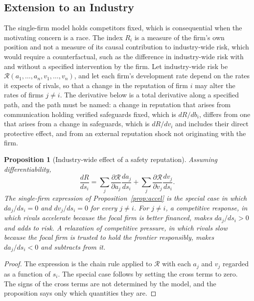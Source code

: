 \documentclass[12pt]{article}
\newtheorem{proposition}{Proposition}
\theoremstyle{definition}
\theoremstyle{remark}
\begin{document}
\subsection{Extension to an Industry}

The single-firm model holds competitors fixed, which is consequential when the motivating concern is a race. The index $R_i$ is a measure of the firm's own position and not a measure of its causal contribution to industry-wide risk, which would require a counterfactual, such as the difference in industry-wide risk with and without a specified intervention by the firm. Let industry-wide risk be $\mathcal R(a_1,\ldots,a_n,v_1,\ldots,v_n)$, and let each firm's development rate depend on the rates it expects of rivals, so that a change in the reputation of firm $i$ may alter the rates of firms $j\neq i$. The derivative below is a total derivative along a specified path, and the path must be named: a change in reputation that arises from communication holding verified safeguards fixed, which is $dR/db_i$, differs from one that arises from a change in safeguards, which is $dR/dv_i$ and includes their direct protective effect, and from an external reputation shock not originating with the firm.

\begin{proposition}[Industry-wide effect of a safety reputation]
\label{prop:industry}
Assuming differentiability,
\[
\frac{dR}{ds_i}=\sum_{j}\frac{\partial\mathcal R}{\partial a_j}\frac{da_j}{ds_i}+\sum_{j}\frac{\partial\mathcal R}{\partial v_j}\frac{dv_j}{ds_i}.
\]
The single-firm expression of Proposition~\ref{prop:accel} is the special case in which $da_j/ds_i=0$ and $dv_j/ds_i=0$ for every $j\neq i$. For $j\neq i$, a competitive response, in which rivals accelerate because the focal firm is better financed, makes $da_j/ds_i>0$ and adds to risk. A relaxation of competitive pressure, in which rivals slow because the focal firm is trusted to hold the frontier responsibly, makes $da_j/ds_i<0$ and subtracts from it.
\end{proposition}

\begin{proof}
The expression is the chain rule applied to $\mathcal R$ with each $a_j$ and $v_j$ regarded as a function of $s_i$. The special case follows by setting the cross terms to zero. The signs of the cross terms are not determined by the model, and the proposition says only which quantities they are. \qedhere
\end{proof}
\end{document}
